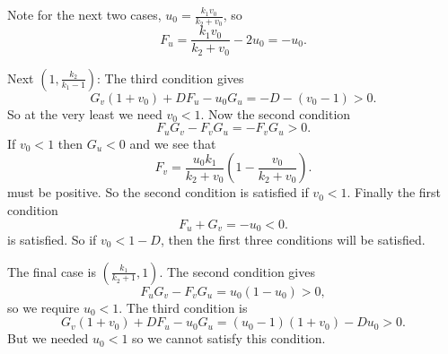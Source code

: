 \documentclass[a4paper, 12pt]{article}
\begin{document}
\begin{enumerate}[label={\bf \arabic{*}.\;}, ref={\arabic{*}},itemsep=3ex, left=0ex]
{\begin{enumerate}[label=(\alph*)]
{              Note for the next two cases, $u_0 = \frac{k_1 v_0}{k_2+ v_0}$, so
              \begin{equation}
                F_u = \frac{k_1 v_0}{k_2+ v_0}-2u_0 = -u_0.
              \end{equation}

              Next $(1,\frac{k_2}{k_1-1})$: The third condition gives
              \begin{equation}
                G_v(1+v_0) + D F_u - u_0G_u=  -D -(v_0-1) > 0.
              \end{equation}
              So at the very least we need $v_0<1$. Now the second condition
              \begin{equation}
                F_uG_v-F_vG_u = -F_vG_u >0.
              \end{equation}
              If $v_0<1$ then $G_u<0$ and we see that
              \begin{equation}
                F_v = \frac{u_0k_1}{k_2+v_0}\left(1- \frac{v_0}{k_2+v_0}\right).
              \end{equation}
              must be positive. So the second condition is satisfied if $v_0<1$. Finally the first condition
              \begin{equation}
                F_u + G_v= -u_0 <0.
              \end{equation}
              is satisfied. So if $v_0<1-D$, then the first three conditions will be satisfied.

              The final case is $(\frac{k_1}{k_2 +1},1)$. The second condition gives
              \begin{equation}
                F_uG_v - F_vG_u  = u_0(1-u_0)>0,
              \end{equation}
              so we require $u_0<1$.
              The third condition is
              \begin{equation}
                G_v(1+v_0) +DF_u - u_0G_u= (u_0-1)(1+v_0) -Du_0 > 0.
              \end{equation}
              But we needed $u_0<1$ so we cannot satisfy this condition.
            }
        \end{enumerate}

      }



\end{enumerate}
\end{document}
